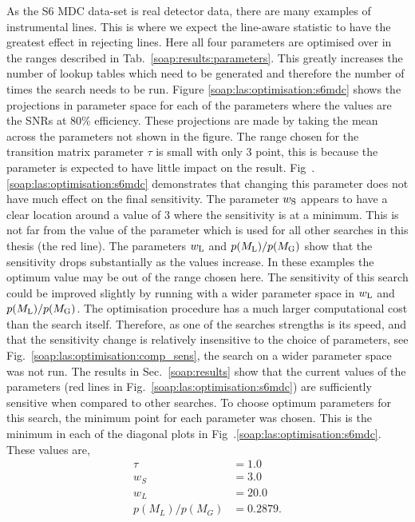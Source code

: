 As the S6 \gls{MDC} data-set is real detector data, there are many examples of instrumental lines. 
This is where we expect the line-aware statistic to have the greatest effect in rejecting lines. 
Here all four parameters are optimised over in the ranges described in Tab.~\ref{soap:results:parameters}. 
This greatly increases the number of lookup tables which need to be generated
and therefore the number of times the search needs to be run. 
Figure \ref{soap:las:optimisation:s6mdc} shows the projections in
parameter space for each of the parameters where the values are the \glspl{SNR} at 80\% efficiency.  
These projections are made by taking the mean~ across the parameters not shown in the figure.
The range chosen for the transition matrix parameter $\tau$ is small with only 3 point, this is because the parameter is expected to have little impact on the result. 
Fig~.\ref{soap:las:optimisation:s6mdc} demonstrates that changing this
parameter does not have much effect on the final sensitivity. 
The parameter $w_{\rm{S}}$ appears to have a clear location around a value of $3$ where the sensitivity is at a minimum. This is not far from the value of the parameter which is used for all other searches in this thesis (the red line).
The parameters $w_{\rm{L}}$ and $p(M_{\rm{L}})/p(M_{\rm{G}})$ show that the sensitivity drops substantially as the values increase. 
In these examples the optimum value may be out of the range chosen here.
The sensitivity of this search could be improved slightly by running with a wider parameter
space in $w_{\rm{L}}$ and $p(M_{\rm{L}})/p(M_{\rm{G}})$.
The optimisation procedure has a much larger computational cost than the search itself. Therefore, as one of the searches strengths is its speed, and that the sensitivity change is relatively insensitive to the choice of parameters, see Fig.~\ref{soap:las:optimisation:comp_sens}, the search on a wider parameter space was not run.
The results in Sec.~\ref{soap:results} show that the current values of the parameters (red lines in Fig.~\ref{soap:las:optimisation:s6mdc}) are sufficiently sensitive when compared to other searches.
To choose optimum parameters for this search, the minimum point for each parameter was chosen. 
This is the minimum in each of the diagonal plots in Fig~.\ref{soap:las:optimisation:s6mdc}.
These values are,
\begin{equation}
	\label{soap:las:optimisation:s6_pars}
\begin{split}
	\tau &= 1.0 \\
	w_S &= 3.0 \\
	w_L &= 20.0 \\
	p(M_L)/p(M_G) &= 0.2879 .
\end{split}
\end{equation}
~

